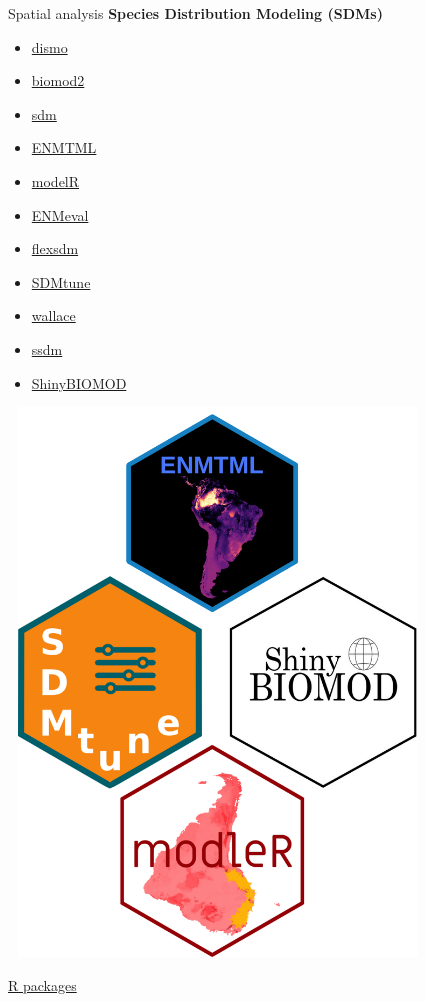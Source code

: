 \documentclass[
  ignorenonframetext,
]{beamer}
\providecommand{\tightlist}{%
  \setlength{\itemsep}{0pt}\setlength{\parskip}{0pt}}\usepackage{longtable,booktabs,array}
\begin{document}
\begin{frame}{Spatial analysis}
\label{spatial-analysis-6}
\textbf{Species Distribution Modeling (SDMs)}

\begin{itemize}
\tightlist
\item
  \href{https://cran.r-project.org/web/packages/dismo/}{dismo}
\item
  \href{https://cran.r-project.org/web/packages/biomod2/}{biomod2}
\item
  \href{https://cran.r-project.org/web/packages/sdm/}{sdm}
\item
  \href{https://github.com/andrefaa/ENMTML}{ENMTML}
\item
  \href{https://model-r.github.io/modleR/}{modelR}
\item
  \href{https://cran.r-project.org/web/packages/ENMeval/}{ENMeval}
\item
  \href{https://sjevelazco.github.io/flexsdm/index.html}{flexsdm}
\item
  \href{https://cran.r-project.org/web/packages/SDMtune/}{SDMtune}
\item
  \href{https://cran.r-project.org/web/packages/wallace/}{wallace}
\item
  \href{https://cran.r-project.org/web/packages/ssdm/}{ssdm}
\item
  \href{https://gitlab.com/IanOndo/shinybiomod}{ShinyBIOMOD}
\end{itemize}

\includegraphics[width=4.375in,height=5.72917in]{img/sdm_sdm_pkg.png}

\href{https://github.com/helixcn/sdm_r_packages}{R packages}
\end{frame}
\end{document}
